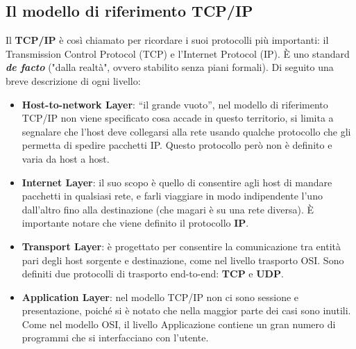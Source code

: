     \subsection{Il modello di riferimento TCP/IP}
        Il \textbf{TCP/IP} è così chiamato per ricordare i suoi protocolli più importanti: il Transmission Control
        Protocol (TCP) e l'Internet Protocol (IP). È uno standard \textbf{\textit{de facto}} ("dalla realtà", ovvero
        stabilito senza piani formali). Di seguito una breve descrizione di ogni livello:
        
        \begin{itemize}
            \item \textbf{Host-to-network Layer}: “il grande vuoto”, nel modello di riferimento TCP/IP non viene
                specificato cosa accade in questo territorio, si limita a segnalare che l’host deve collegarsi alla
                rete usando qualche protocollo che gli permetta di spedire pacchetti IP. Questo protocollo però
                non è definito e varia da host a host.
                
            \item \textbf{Internet Layer}: il suo scopo è quello di consentire agli host di mandare pacchetti in qualsiasi
                rete, e farli viaggiare in modo indipendente l’uno dall’altro fino alla destinazione (che magari è
                su una rete diversa). È importante notare che viene definito il protocollo \textbf{IP}.
            
            \item \textbf{Transport Layer}: è progettato per consentire la comunicazione tra entità pari degli host
                sorgente e destinazione, come nel livello trasporto OSI. Sono definiti due protocolli di trasporto
                end-to-end: \textbf{TCP} e \textbf{UDP}.

            \item \textbf{Application Layer}: nel modello TCP/IP non ci sono sessione e presentazione, poiché si è notato
                che nella maggior parte dei casi sono inutili. Come nel modello OSI, il livello Applicazione
                contiene un gran numero di programmi che si interfacciano con l’utente.
        \end{itemize}